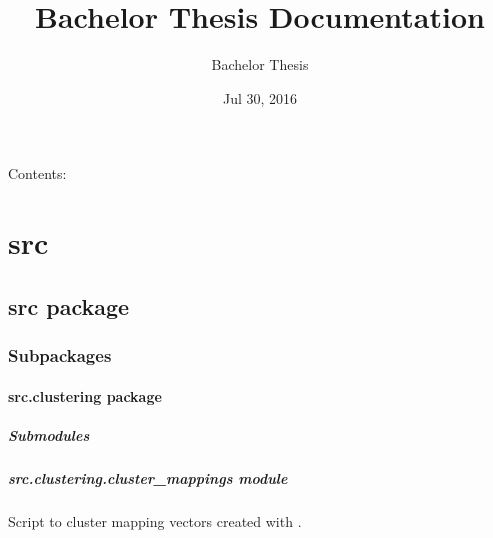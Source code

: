 \documentclass[letterpaper,10pt,english]{sphinxmanual}
\title{Bachelor Thesis Documentation}
\date{Jul 30, 2016}
\author{Bachelor Thesis}
\begin{document}
\maketitle
\tableofcontents
{}\label{index::doc}


Contents:


\chapter{src}
\label{index:src}\label{index:welcome-to-bachelor-thesis-s-documentation}

\section{src package}
\label{src::doc}\label{src:src-package}

\subsection{Subpackages}
\label{src:subpackages}

\subsubsection{src.clustering package}
\label{src.clustering:src-clustering-package}\label{src.clustering::doc}

\paragraph{Submodules}
\label{src.clustering:submodules}

\paragraph{src.clustering.cluster\_mappings module}
\label{src.clustering:module-src.clustering.cluster_mappings}\label{src.clustering:src-clustering-cluster-mappings-module}
Script to cluster mapping vectors created with {\hyperref[src.mapping:module\string-src.mapping.mapthreading]{}}.
\end{document}
